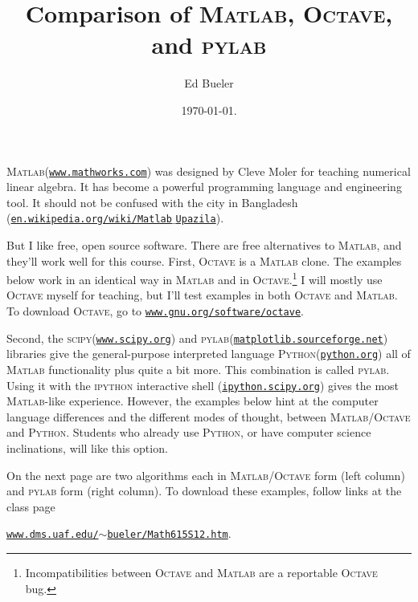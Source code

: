 \documentclass[11pt]{amsart}
\newcommand{\Matlab}{\textsc{Matlab}\xspace}
\newcommand{\Octave}{\textsc{Octave}\xspace}
\newcommand{\python}{\textsc{Python}\xspace}
\newcommand{\pylab}{\textsc{pylab}\xspace}
\newcommand{\scipy}{\textsc{scipy}\xspace}
\begin{document}
\title{Comparison of \textsc{Matlab}, \textsc{Octave}, and \textsc{pylab}}

\author{Ed Bueler}

\date{\today.}

\maketitle
\normalsize

\newcommand{\hrf}[2]{\href{#1}{\texttt{#2}}}

\Matlab (\hrf{http://www.mathworks.com/}{www.mathworks.com}) was designed by Cleve Moler for teaching numerical linear algebra.  It has become a powerful programming language and engineering tool.  It should not be confused with the city in Bangladesh (\hrf{http://en.wikipedia.org/wiki/Matlab_Upazila}{en.wikipedia.org/wiki/Matlab$\_$Upazila}).

But I like free, open source software.  There are free alternatives to \Matlab, and they'll work well for this course.  First, \Octave is a \Matlab clone.  The examples below work in an identical way in \Matlab and in \Octave.\footnote{Incompatibilities between \Octave and \Matlab are a reportable \Octave bug.}  I will mostly use \Octave myself for teaching, but I'll test examples in both \Octave and \Matlab.  To download \Octave, go to 
\hrf{http://www.gnu.org/software/octave/}{www.gnu.org/software/octave}.

Second, the \scipy (\hrf{http://www.scipy.org/}{www.scipy.org}) and \pylab (\hrf{http://matplotlib.sourceforge.net/}{matplotlib.sourceforge.net}) libraries give the general-purpose interpreted language \python (\hrf{http://python.org/}{python.org}) all of \Matlab functionality plus quite a bit more.  This combination is called \pylab.  Using it with the \textsc{ipython} interactive shell (\hrf{http://ipython.scipy.org/moin/}{ipython.scipy.org}) gives the most \Matlab-like experience.  However, the examples below hint at the computer language differences and the different modes of thought, between \Matlab/\Octave and \python.  Students who already use \python, or have computer science inclinations, will like this option.

On the next page are two algorithms each in \Matlab/\Octave form (left column) and \pylab form (right column).  To download these examples, follow links at the class page

\centerline{\hrf{http://www.dms.uaf.edu/~bueler/Math615S12.htm}{www.dms.uaf.edu/$\sim$bueler/Math615S12.htm}.}
\end{document}
